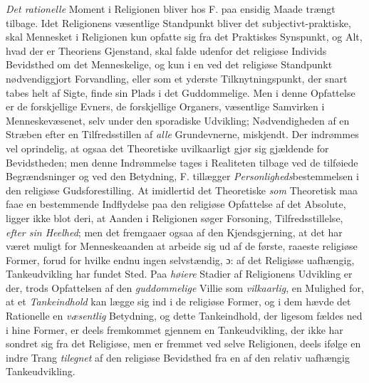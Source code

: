 \emph{Det rationelle} Moment i Religionen bliver hos F. paa ensidig Maade trængt
tilbage. Idet Religionens væsentlige Standpunkt bliver det subjectivt-praktiske,
skal Mennesket i Religionen kun opfatte sig fra det Praktiskes Synspunkt, og Alt,
hvad der er Theoriens Gjenstand, skal falde udenfor det religiøse Individs
Bevidsthed om det Menneskelige, og kun i en ved det religiøse Standpunkt
nødvendiggjort Forvandling, eller som et yderste Tilknytningspunkt, der snart
tabes helt af Sigte, finde sin Plads i det Guddommelige. Men i denne Opfattelse
er de forskjellige Evners, de forskjellige Organers, væsentlige Samvirken i
Menneskevæsenet, selv under den sporadiske Udvikling; Nødvendigheden af en
Stræben efter en Tilfredsstillen af \emph{alle} Grundevnerne, miskjendt. Der
indrømmes vel oprindelig, at ogsaa det Theoretiske uvilkaarligt gjør sig
gjældende for Bevidstheden; men denne Indrømmelse tages i Realiteten tilbage ved
de tilføiede Begrændsninger og ved den Betydning, F. tillægger
\emph{Personligheds}bestemmelsen i den religiøse Gudsforestilling. At imidlertid
det Theoretiske \emph{som} Theoretisk maa faae en bestemmende Indflydelse paa den
religiøse Opfattelse af det Absolute, ligger ikke blot deri, at Aanden i
Religionen søger Forsoning, Tilfredsstillelse, \emph{efter sin Heelhed}; men det
fremgaaer ogsaa af den Kjendsgjerning, at det har været muligt for
Menneskeaanden at arbeide sig ud af de første, raaeste religiøse Former, forud
for hvilke endnu ingen selvstændig, ɔ: af det Religiøse uafhængig,
Tankeudvikling har fundet Sted. Paa \emph{høiere} Stadier af Religionens
Udvikling
 \setcounter{footnote}{0}%
er der, trods Opfattelsen af den \emph{guddommelige} Villie som
\emph{vilkaarlig}, en Mulighed for, at et \emph{Tankeindhold} kan lægge sig ind i
de religiøse Former, og i dem hævde det Rationelle en \emph{væsentlig} Betydning,
og dette Tankeindhold, der ligesom fældes ned i hine Former, er deels fremkommet
gjennem en Tankeudvikling, der ikke har sondret sig fra det Religiøse, men er
fremmet ved selve Religionen, deels ifølge en indre Trang \emph{tilegnet} af den
religiøse Bevidsthed fra en af den relativ uafhængig Tankeudvikling.

